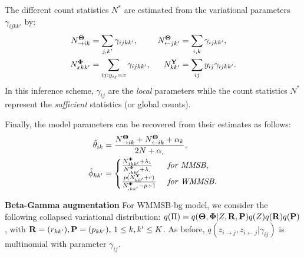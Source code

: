 The different count statistics $N^*$ are estimated from the variational parameters $\gamma_{ijkk'}$ by:
%
\begin{align} \label{eq:sss}
    N^{{\boldsymbol{\Theta}}}_{\rightarrow ik} &= \sum_{j, k'} \gamma_{ijkk'},       & N^{{\boldsymbol{\Theta}}}_{\leftarrow jk'} &= \sum_{i, k} \gamma_{ijkk'},  \nonumber \\
    N^{{\boldsymbol{\Phi}}}_{xkk'} &= \sum_{ij:y_{ij}=x} \gamma_{ijkk'},  & N^{{\mathbf{Y}}}_{kk'} &= \sum_{ij} y_{ij}\gamma_{ijkk'}.
\end{align}
%
In this inference scheme, $\gamma_{ij}$ are the \emph{local} parameters while the count statistics $N^*$ represent the \emph{sufficient} statistics (or global counts).

Finally, the model parameters can be recovered from their estimates as follows:
%
\begin{align*}
\hat \theta_{ik} &= \frac{N^{{\Bs{\Theta}}}_{\rightarrow ik} + N^{{\Bs{\Theta}}}_{\leftarrow ik} + \alpha_k}{2N + \alpha_{\bm{.}}}, \\
\hat \phi_{kk'}&=\begin{cases}
     \frac{N^{{\Bs{\Phi}}}_{1 kk'} + \lambda_1}{N^{{\Bs{\Phi}}}_{\bm{.}kk'} + \lambda_{\bm{.}}} & \textrm{ \textit{for MMSB}}, \\
    \frac{p(N^{\B{Y}}_{kk'} + r)}{N^{{\Bs{\Phi}}}_{\bm{.}kk'} - p + 1}  & \textrm{ \textit{for WMMSB}}.  %
    \end{cases}
\end{align*}

\textbf{Beta-Gamma augmentation} For WMMSB-bg model, we consider the following collapsed variational distribution: $q(\Pi) = q({\boldsymbol{\Theta}}, {\boldsymbol{\Phi}}|Z, {\mathbf{R}}, {\mathbf{P}})q(Z)q({\mathbf{R}})q({\mathbf{P}})$,
with ${\mathbf{R}}=(r_{kk'}), {\mathbf{P}}=(p_{kk'}), \, 1 \le k,k' \le K$. As before, $q(z_{i \rightarrow j}, z_{i \leftarrow j}|\gamma_{ij})$ is multinomial with parameter $\gamma_{ij}$.

